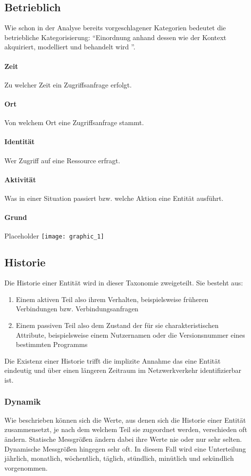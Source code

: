 \subsection{Betrieblich}
Wie schon in der Analyse bereits vorgeschlagener Kategorien bedeutet die betriebliche Kategorisierung: ``Einordnung anhand dessen wie der Kontext akquiriert, modelliert und behandelt wird ''.
\paragraph{Zeit}
Zu welcher Zeit ein Zugriffsanfrage erfolgt.
\paragraph{Ort}
Von welchem Ort eine Zugriffsanfrage stammt.
\paragraph{Identität}
Wer Zugriff auf eine Ressource erfragt.
\paragraph{Aktivität}
Was in einer Situation passiert bzw. welche Aktion eine Entität ausführt.
\paragraph{Grund}
Placeholder\linebreak
\texttt{[image: graphic\_1]}
\subsection{Historie}
Die Historie einer Entität wird in dieser Taxonomie zweigeteilt. Sie besteht aus:
\begin{enumerate}
\item{Einem aktiven Teil also ihrem Verhalten, beispielsweise früheren Verbindungen bzw. Verbindungsanfragen}
\item{Einem passiven Teil also dem Zustand der für sie charakteristischen Attribute, beispielsweise einem Nutzernamen oder die Versionsnummer eines bestimmten Programms}
\end{enumerate}
Die Existenz einer Historie trifft die implizite Annahme das eine Entität eindeutig und über einen längeren Zeitraum im Netzwerkverkehr identifizierbar ist.
\subsubsection{Dynamik}
Wie 
 beschrieben können sich die Werte, aus denen sich die Historie einer Entität zusammensetzt, je nach dem welchem Teil sie zugeordnet werden, verschieden oft ändern.
Statische Messgrößen ändern dabei ihre Werte nie oder nur sehr selten. Dynamische Messgrößen hingegen sehr oft. In diesem Fall wird eine Unterteilung jährlich, monatlich, wöchentlich, täglich, stündlich, minütlich und sekündlich vorgenommen.
